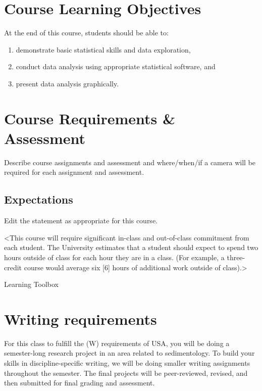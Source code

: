 \documentclass[11pt,]{article}
\providecommand{\tightlist}{%
  \setlength{\itemsep}{0pt}\setlength{\parskip}{0pt}}
\begin{document}
\hypertarget{course-learning-objectives}{%
\section{Course Learning Objectives}\label{course-learning-objectives}}

At the end of this course, students should be able to:

\begin{enumerate}
\def\labelenumi{\arabic{enumi}.}
\tightlist
\item
  demonstrate basic statistical skills and data exploration,
\item
  conduct data analysis using appropriate statistical software, and
\item
  present data analysis graphically.
\end{enumerate}

\hypertarget{course-requirements-assessment}{%
\section{Course Requirements \&
Assessment}\label{course-requirements-assessment}}

Describe course assignments and assessment and where/when/if a camera
will be required for each assignment and assessment.

\hypertarget{expectations}{%
\subsection{Expectations}\label{expectations}}

Edit the statement as appropriate for this course.

\textless This course will require significant in-class and out-of-class
commitment from each student. The University estimates that a student
should expect to spend two hours outside of class for each hour they are
in a class. (For example, a three-credit course would average six
{[}6{]} hours of additional work outside of class).\textgreater{}

Learning Toolbox

\hypertarget{writing-requirements}{%
\section{Writing requirements}\label{writing-requirements}}

For this class to fulfill the (W) requirements of USA, you will be doing
a semester-long research project in an area related to sedimentology. To
build your skills in discipline-specific writing, we will be doing
smaller writing assignments throughout the semester. The final projects
will be peer-reviewed, revised, and then submitted for final grading and
assessment.
\end{document}
